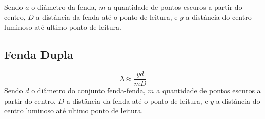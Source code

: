 Sendo $a$ o diâmetro da fenda, $m$ a quantidade de pontos escuros a partir do centro, $D$ a distância da fenda até o ponto de leitura, e $y$ a distância do centro luminoso até ultimo ponto de leitura.

\subsection{Fenda Dupla}\label{fenda_dupla}
\begin{equation}
	\lambda \approx \frac{yd}{mD}
\end{equation}
Sendo $d$ o diâmetro do conjunto fenda-fenda, $m$ a quantidade de pontos escuros a partir do centro, $D$ a distância da fenda até o ponto de leitura, e $y$ a distância do centro luminoso até ultimo ponto de leitura.
